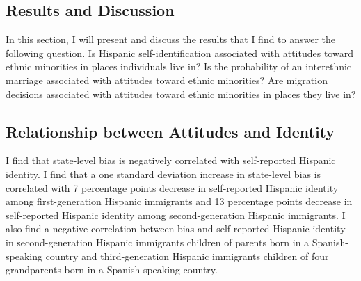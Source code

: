 \documentclass[12pt, fullpage]{article}
\begin{document}
\subsection{Results and Discussion} %
\label{sec:results}

In this section, I will present and discuss the results that I find to answer the following question. Is Hispanic self-identification associated with attitudes toward ethnic minorities in places individuals live in? Is the probability of an interethnic marriage associated with attitudes toward ethnic minorities? Are migration decisions associated with attitudes toward ethnic minorities in places they live in?

\subsection{Relationship between Attitudes and Identity}\label{sub:the_determinants_of_identity}

I find that state-level bias is negatively correlated with self-reported Hispanic identity. I find that a one standard deviation increase in state-level bias is correlated with 7 percentage points decrease in self-reported Hispanic identity among first-generation Hispanic immigrants and 13 percentage points decrease in self-reported Hispanic identity among second-generation Hispanic immigrants. I also find a negative correlation between bias and self-reported Hispanic identity in second-generation Hispanic immigrants children of parents born in a Spanish-speaking country and third-generation Hispanic immigrants children of four grandparents born in a Spanish-speaking country.


\end{document}
